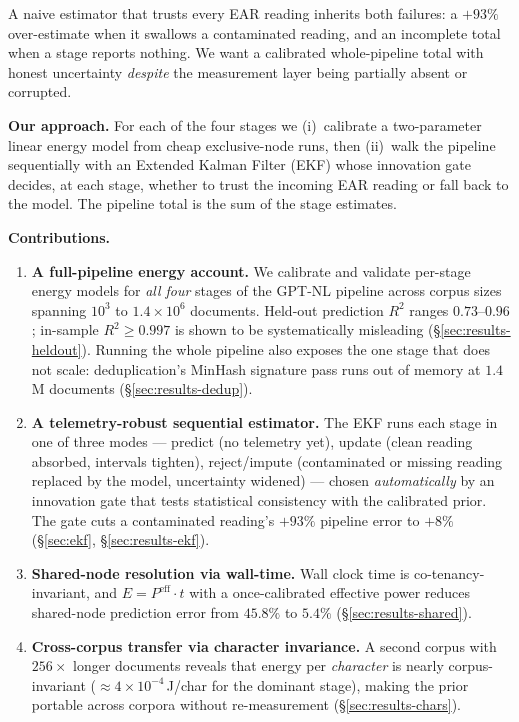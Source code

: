\documentclass{article}
\begin{document}
A naive estimator that trusts every EAR reading inherits both failures: a $+93\%$ over-estimate when it swallows a contaminated reading, and an incomplete total when a stage reports nothing. We want a calibrated whole-pipeline total with honest uncertainty \emph{despite} the measurement layer being partially absent or corrupted.

\textbf{Our approach.} For each of the four stages we (i)~calibrate a two-parameter linear energy model from cheap exclusive-node runs, then (ii)~walk the pipeline sequentially with an Extended Kalman Filter (EKF) whose innovation gate decides, at each stage, whether to trust the incoming EAR reading or fall back to the model. The pipeline total is the sum of the stage estimates.

\textbf{Contributions.}
\begin{enumerate}
  \item \textbf{A full-pipeline energy account.} We calibrate and validate per-stage energy models for \emph{all four} stages of the GPT-NL pipeline across corpus sizes spanning $10^3$ to $1.4{\times}10^6$ documents. Held-out prediction $R^2$ ranges $0.73$--$0.96$; in-sample $R^2 \ge 0.997$ is shown to be systematically misleading (\S\ref{sec:results-heldout}). Running the whole pipeline also exposes the one stage that does not scale: deduplication's MinHash signature pass runs out of memory at $1.4$M documents (\S\ref{sec:results-dedup}).
  \item \textbf{A telemetry-robust sequential estimator.} The EKF runs each stage in one of three modes --- predict (no telemetry yet), update (clean reading absorbed, intervals tighten), reject/impute (contaminated or missing reading replaced by the model, uncertainty widened) --- chosen \emph{automatically} by an innovation gate that tests statistical consistency with the calibrated prior. The gate cuts a contaminated reading's $+93\%$ pipeline error to $+8\%$ (\S\ref{sec:ekf}, \S\ref{sec:results-ekf}).
  \item \textbf{Shared-node resolution via wall-time.} Wall clock time is co-tenancy-invariant, and $E = P^{\mathrm{eff}} \cdot t$ with a once-calibrated effective power reduces shared-node prediction error from $45.8\%$ to $5.4\%$ (\S\ref{sec:results-shared}).
  \item \textbf{Cross-corpus transfer via character invariance.} A second corpus with $256\times$ longer documents reveals that energy per \emph{character} is nearly corpus-invariant (${\approx}4{\times}10^{-4}$\,J/char for the dominant stage), making the prior portable across corpora without re-measurement (\S\ref{sec:results-chars}).
\end{enumerate}
\end{document}
